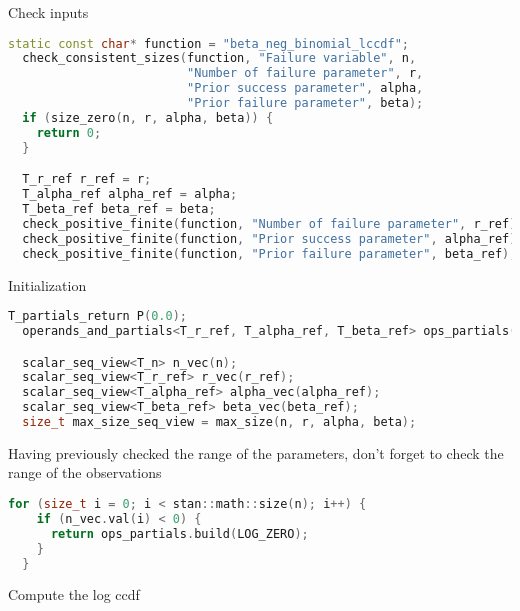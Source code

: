 \documentclass[11pt]{article}
\begin{document}
Check inputs
\begin{lstlisting}[language=c++, style=lgeneral]
  static const char* function = "beta_neg_binomial_lccdf";
  check_consistent_sizes(function, "Failure variable", n,
                         "Number of failure parameter", r,
                         "Prior success parameter", alpha,
                         "Prior failure parameter", beta);
  if (size_zero(n, r, alpha, beta)) {
    return 0;
  }

  T_r_ref r_ref = r;
  T_alpha_ref alpha_ref = alpha;
  T_beta_ref beta_ref = beta;
  check_positive_finite(function, "Number of failure parameter", r_ref);
  check_positive_finite(function, "Prior success parameter", alpha_ref);
  check_positive_finite(function, "Prior failure parameter", beta_ref);
\end{lstlisting}

Initialization
\begin{lstlisting}[language=c++, style=lgeneral]
  T_partials_return P(0.0);
  operands_and_partials<T_r_ref, T_alpha_ref, T_beta_ref> ops_partials(r_ref, alpha_ref, beta_ref);

  scalar_seq_view<T_n> n_vec(n);
  scalar_seq_view<T_r_ref> r_vec(r_ref);
  scalar_seq_view<T_alpha_ref> alpha_vec(alpha_ref);
  scalar_seq_view<T_beta_ref> beta_vec(beta_ref);
  size_t max_size_seq_view = max_size(n, r, alpha, beta);
\end{lstlisting}

Having previously checked the range of the parameters, don’t forget to check the range of the observations
\begin{lstlisting}[language=c++, style=lgeneral]
  for (size_t i = 0; i < stan::math::size(n); i++) {
    if (n_vec.val(i) < 0) {
      return ops_partials.build(LOG_ZERO);
    }
  }
\end{lstlisting}

Compute the log ccdf
\end{document}
